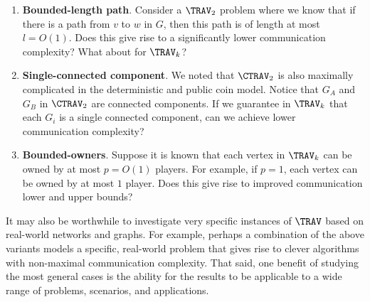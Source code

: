 \begin{enumerate}
    \item \textbf{Bounded-length path}. Consider a $\TRAV_2$ problem where we know that if there is a path from $v$ to $w$ in $G$, then this path is of length at most $l = O(1)$. Does this give rise to a significantly lower communication complexity? What about for $\TRAV_k$?
    \item \textbf{Single-connected component}. We noted that $\CTRAV_2$ is also maximally complicated in the deterministic and public coin model. Notice that $G_A$ and $G_B$ in $\CTRAV_2$ are connected components. If we guarantee in $\TRAV_k$ that each $G_i$ is a single connected component, can we achieve lower communication complexity?
    \item \textbf{Bounded-owners}. Suppose it is known that each vertex in $\TRAV_k$ can be owned by at most $p = O(1)$ players. For example, if $p=1$, each vertex can be owned by at most $1$ player. Does this give rise to improved communication lower and upper bounds?
\end{enumerate}

It may also be worthwhile to investigate very specific instances of $\TRAV$ based on real-world networks and graphs. For example, perhaps a combination of the above variants models a specific, real-world problem that gives rise to clever algorithms with non-maximal communication complexity. That said, one benefit of studying the most general cases is the ability for the results to be applicable to a wide range of problems, scenarios, and applications.